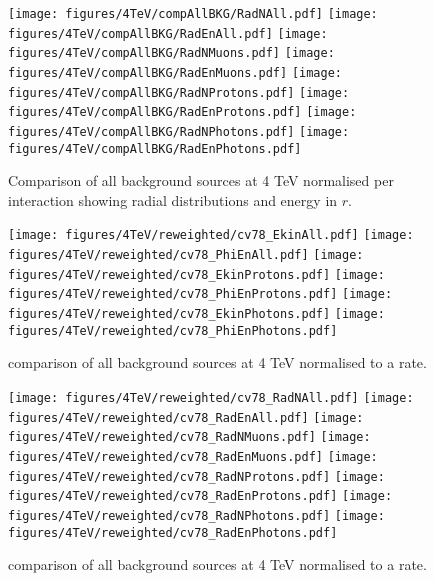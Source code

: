 \begin{figure}
\begin{center}
  \texttt{[image: figures/4TeV/compAllBKG/RadNAll.pdf]}
  \texttt{[image: figures/4TeV/compAllBKG/RadEnAll.pdf]}
  \texttt{[image: figures/4TeV/compAllBKG/RadNMuons.pdf]}
  \texttt{[image: figures/4TeV/compAllBKG/RadEnMuons.pdf]}
  \texttt{[image: figures/4TeV/compAllBKG/RadNProtons.pdf]}
  \texttt{[image: figures/4TeV/compAllBKG/RadEnProtons.pdf]}
  \texttt{[image: figures/4TeV/compAllBKG/RadNPhotons.pdf]}
  \texttt{[image: figures/4TeV/compAllBKG/RadEnPhotons.pdf]}
\end{center}
\vspace{-0.6cm}
 \caption{Comparison of all background sources at 4 TeV normalised per interaction showing radial distributions and energy in $r$.
  \label{fig:compAllBKG_perInt2}}
\end{figure}

\begin{figure}
\begin{center}
  \texttt{[image: figures/4TeV/reweighted/cv78\_EkinAll.pdf]}
  \texttt{[image: figures/4TeV/reweighted/cv78\_PhiEnAll.pdf]}
  \texttt{[image: figures/4TeV/reweighted/cv78\_EkinProtons.pdf]}
  \texttt{[image: figures/4TeV/reweighted/cv78\_PhiEnProtons.pdf]}
  \texttt{[image: figures/4TeV/reweighted/cv78\_EkinPhotons.pdf]}
  \texttt{[image: figures/4TeV/reweighted/cv78\_PhiEnPhotons.pdf]}
\end{center}
\vspace{-0.6cm}
 \caption{comparison of all background sources at 4 TeV normalised to a rate.
  \label{compAllBKG4TeV_rates}}
\end{figure}

\begin{figure}
\begin{center}
  \texttt{[image: figures/4TeV/reweighted/cv78\_RadNAll.pdf]}
  \texttt{[image: figures/4TeV/reweighted/cv78\_RadEnAll.pdf]}
  \texttt{[image: figures/4TeV/reweighted/cv78\_RadNMuons.pdf]}
  \texttt{[image: figures/4TeV/reweighted/cv78\_RadEnMuons.pdf]}
  \texttt{[image: figures/4TeV/reweighted/cv78\_RadNProtons.pdf]}
  \texttt{[image: figures/4TeV/reweighted/cv78\_RadEnProtons.pdf]}
  \texttt{[image: figures/4TeV/reweighted/cv78\_RadNPhotons.pdf]}
  \texttt{[image: figures/4TeV/reweighted/cv78\_RadEnPhotons.pdf]}
\end{center}
\vspace{-0.6cm}
 \caption{comparison of all background sources at 4 TeV normalised to a rate.
  \label{compAllBKG4TeV_rates2}}
\end{figure}

